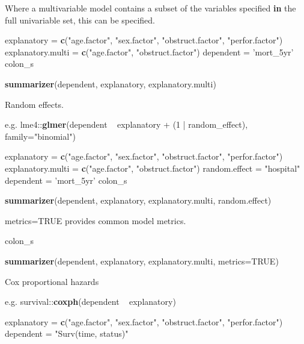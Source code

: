 \documentclass[
]{article}
\newenvironment{Shaded}{\begin{snugshade}}{\end{snugshade}}
\newcommand{\ControlFlowTok}[1]{\textcolor[rgb]{0.12,0.11,0.11}{\textbf{#1}}}
\newcommand{\DataTypeTok}[1]{\textcolor[rgb]{0.00,0.34,0.68}{#1}}
\newcommand{\DecValTok}[1]{\textcolor[rgb]{0.69,0.50,0.00}{#1}}
\newcommand{\KeywordTok}[1]{\textcolor[rgb]{0.12,0.11,0.11}{\textbf{#1}}}
\newcommand{\NormalTok}[1]{\textcolor[rgb]{0.12,0.11,0.11}{#1}}
\newcommand{\OperatorTok}[1]{\textcolor[rgb]{0.12,0.11,0.11}{#1}}
\newcommand{\OtherTok}[1]{\textcolor[rgb]{0.00,0.43,0.16}{#1}}
\newcommand{\StringTok}[1]{\textcolor[rgb]{0.75,0.01,0.01}{#1}}
\begin{document}
\begin{Shaded}
\begin{Highlighting}[]
\NormalTok{Where a multivariable model contains a subset of the variables specified }\ControlFlowTok{in}\NormalTok{ the full univariable set, this can be specified.}

\NormalTok{explanatory =}\StringTok{ }\KeywordTok{c}\NormalTok{(}\StringTok{"age.factor"}\NormalTok{, }\StringTok{"sex.factor"}\NormalTok{, }\StringTok{"obstruct.factor"}\NormalTok{, }\StringTok{"perfor.factor"}\NormalTok{)}
\NormalTok{explanatory.multi =}\StringTok{ }\KeywordTok{c}\NormalTok{(}\StringTok{"age.factor"}\NormalTok{, }\StringTok{"obstruct.factor"}\NormalTok{)}
\NormalTok{dependent =}\StringTok{ 'mort_5yr'}
\NormalTok{colon_s }\OperatorTok{%>%}
\StringTok{  }\KeywordTok{summarizer}\NormalTok{(dependent, explanatory, explanatory.multi)}

\NormalTok{Random effects.}

\NormalTok{e.g. lme4}\OperatorTok{::}\KeywordTok{glmer}\NormalTok{(dependent }\OperatorTok{~}\StringTok{ }\NormalTok{explanatory }\OperatorTok{+}\StringTok{ }\NormalTok{(}\DecValTok{1} \OperatorTok{|}\StringTok{ }\NormalTok{random_effect), }\DataTypeTok{family=}\StringTok{"binomial"}\NormalTok{)}

\NormalTok{explanatory =}\StringTok{ }\KeywordTok{c}\NormalTok{(}\StringTok{"age.factor"}\NormalTok{, }\StringTok{"sex.factor"}\NormalTok{, }\StringTok{"obstruct.factor"}\NormalTok{, }\StringTok{"perfor.factor"}\NormalTok{)}
\NormalTok{explanatory.multi =}\StringTok{ }\KeywordTok{c}\NormalTok{(}\StringTok{"age.factor"}\NormalTok{, }\StringTok{"obstruct.factor"}\NormalTok{)}
\NormalTok{random.effect =}\StringTok{ "hospital"}
\NormalTok{dependent =}\StringTok{ 'mort_5yr'}
\NormalTok{colon_s }\OperatorTok{%>%}
\StringTok{  }\KeywordTok{summarizer}\NormalTok{(dependent, explanatory, explanatory.multi, random.effect)}

\NormalTok{metrics=}\OtherTok{TRUE}\NormalTok{ provides common model metrics.}

\NormalTok{colon_s }\OperatorTok{%>%}
\StringTok{  }\KeywordTok{summarizer}\NormalTok{(dependent, explanatory, explanatory.multi,  }\DataTypeTok{metrics=}\OtherTok{TRUE}\NormalTok{)}

\NormalTok{Cox proportional hazards}

\NormalTok{e.g. survival}\OperatorTok{::}\KeywordTok{coxph}\NormalTok{(dependent }\OperatorTok{~}\StringTok{ }\NormalTok{explanatory)}

\NormalTok{explanatory =}\StringTok{ }\KeywordTok{c}\NormalTok{(}\StringTok{"age.factor"}\NormalTok{, }\StringTok{"sex.factor"}\NormalTok{, }\StringTok{"obstruct.factor"}\NormalTok{, }\StringTok{"perfor.factor"}\NormalTok{)}
\NormalTok{dependent =}\StringTok{ "Surv(time, status)"}

}}}
\end{Highlighting}
\end{Shaded}
\end{document}
